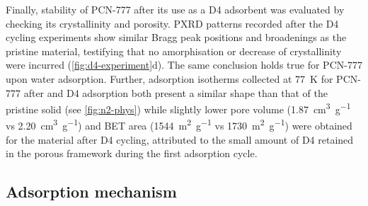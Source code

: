 Finally, stability of PCN-777 after its use as a D4 adsorbent was evaluated
by checking its crystallinity and porosity. PXRD patterns recorded after the D4
cycling experiments show similar Bragg peak positions and broadenings as the
pristine material, testifying that no amorphisation or decrease of
crystallinity were incurred (\cref{fig:d4-experiment}d). The same conclusion
holds true for PCN-777 upon water adsorption. Further,  adsorption
isotherms collected at \SI{77}{\kelvin} for PCN-777 after  and D4
adsorption both present a similar shape than that of the pristine solid (see
\cref{fig:n2-phys}) while slightly lower pore volume
(\SI{1.87}{\centi\metre\cubed\per\gram} vs
\SI{2.20}{\centi\metre\cubed\per\gram}) and BET area
(\SI{1544}{\metre\squared\per\gram} vs \SI{1730}{\metre\squared\per\gram}) were
obtained for the material after D4 cycling, attributed to the small amount of D4
retained in the porous framework during the first adsorption cycle.

\subsection{Adsorption mechanism}\label{adsorption-mechanism}


